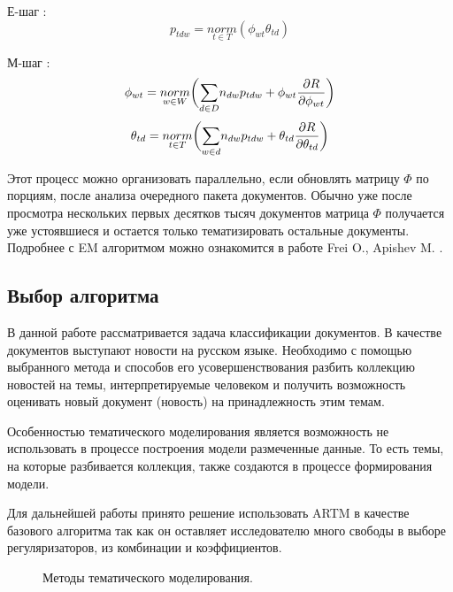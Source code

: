 Е-шаг :
\begin{equation}
p_{tdw}=\underset{t \in T}{norm}(\phi_{wt} \theta_{td})
\end{equation}

М-шаг : 
\begin{equation}
\phi_{wt} = \underset{w \in W}{norm}\bigg( \underset{d \in D}\sum{n_{dw} p_{tdw} + \phi_{wt} {{\partial R} \over {\partial \phi_{wt}}}} \bigg)
\end{equation}
\begin{equation}
\theta_{td} = \underset{t \in T}{norm}\bigg( \underset{w \in d}\sum{n_{dw} p_{tdw} + \theta_{td} {{\partial R} \over {\partial \theta_{td}}}} \bigg)
\end{equation}

Этот процесс можно организовать параллельно, если обновлять матрицу   $\Phi$ по порциям, после анализа очередного пакета документов. Обычно уже после просмотра нескольких первых десятков тысяч документов матрица $\Phi$ получается уже устоявшиеся и остается только тематизировать остальные документы. Подробнее с EM алгоритмом можно ознакомится в работе Frei O., Apishev M. \cite{EMonline}.

\subsection{Выбор алгоритма}

В данной работе рассматривается задача классификации документов. В качестве документов выступают новости на русском языке. Необходимо с помощью выбранного метода и способов его усовершенствования разбить коллекцию новостей на темы, интерпретируемые человеком и получить возможность оценивать новый документ (новость) на принадлежность этим темам.

Особенностью тематического моделирования является возможность не использовать в процессе построения модели размеченные данные. То есть темы, на которые разбивается коллекция, также создаются в процессе формирования модели.

Для дальнейшей работы принято решение использовать ARTM в качестве базового алгоритма так как он оставляет исследователю много свободы в выборе регуляризаторов, из комбинации и коэффициентов.

\begin{figure}[h]
    \caption{Методы тематического моделирования.}
    \label{fig:MetodTM}
\end{figure}

